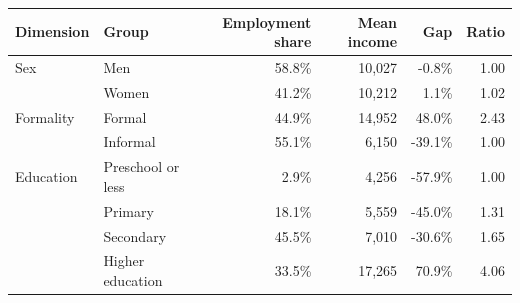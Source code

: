 \begin{tabular}{lp{}rrrr}
\toprule
    Dimension & Group & Employment share & Mean income & Gap & Ratio \\
    \midrule
Sex & Men & 58.8\% & 10,027 & -0.8\% & 1.00 \\
& Women & 41.2\% & 10,212 & 1.1\% & 1.02 \\
\midrule
    Formality & Formal & 44.9\% & 14,952 & 48.0\% & 2.43 \\
& Informal & 55.1\% & 6,150 & -39.1\% & 1.00 \\
\midrule
    Education & Preschool or less & 2.9\% & 4,256 & -57.9\% & 1.00 \\
& Primary & 18.1\% & 5,559 & -45.0\% & 1.31 \\
& Secondary & 45.5\% & 7,010 & -30.6\% & 1.65 \\
& Higher education & 33.5\% & 17,265 & 70.9\% & 4.06\\
\bottomrule\end{tabular}

